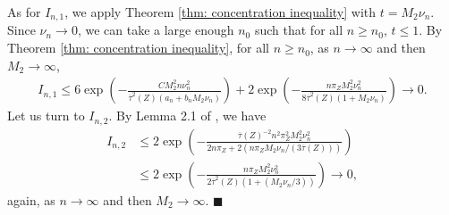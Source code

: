 \documentclass[12pt, fullpage]{amsart}
\theoremstyle{definition}
\theoremstyle{definition}
\theoremstyle{definition}
\begin{document}
\begin{bibunit}[econometrica]
As for $I_{n,1}$, we apply Theorem \ref{thm: concentration inequality} with $t = M_2 \nu_n$. Since $\nu_n \rightarrow 0$, we can take a large enough $n_0$ such that for all $n \ge n_0$, $t \le 1$. By Theorem \ref{thm: concentration inequality}, for all $n \ge n_0$, as $n \rightarrow \infty$ and then $M_2 \rightarrow \infty$,
\begin{align*}
    I_{n,1} \le 6 \exp\left( - \frac{C M_2^2 n \nu_n^2}{\overline \tau^2(Z)(a_n + b_n M_2 \nu_n)}\right) + 2 \exp\left( - \frac{\displaystyle n \pi_Z M_2^2 \nu_n^2}{\displaystyle 8 \overline \tau^2(Z)(1 + M_2 \nu_n)} \right) \rightarrow 0.
\end{align*}
Let us turn to $I_{n,2}$. By Lemma 2.1 of \cite{Chung/Lu:AC:2002}, we have 
\begin{align*}
    I_{n,2} &\le 2 \exp\left( - \frac{\overline \tau(Z)^{-2} n^2 \pi_Z^2 M_2^2 \nu_n^2}{2 n \pi_Z + 2 \left(n \pi_Z M_2 \nu_n / (3 \overline \tau(Z))\right)}\right) \\
	&\le 2 \exp\left( - \frac{n \pi_Z M_2^2 \nu_n^2}{2\overline \tau^2(Z)\left(1 + \left( M_2 \nu_n / 3\right)\right)}\right) \rightarrow 0,
\end{align*}
again, as $n \rightarrow \infty$ and then $M_2 \rightarrow \infty$. $\blacksquare$\medskip


\end{bibunit}
\end{document}
